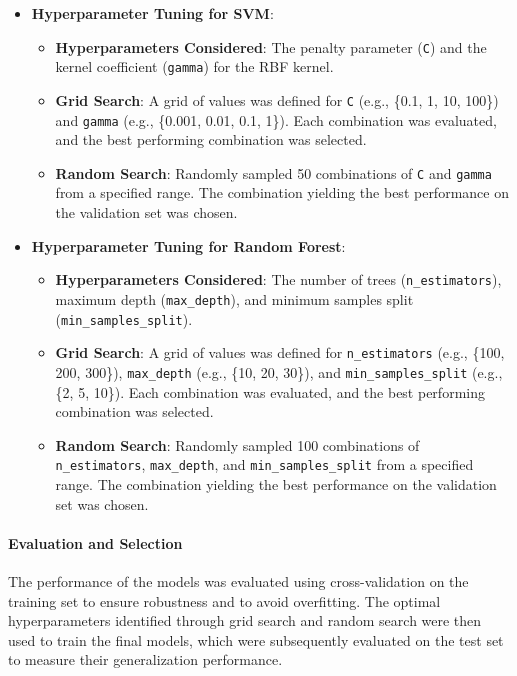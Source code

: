 \begin{itemize}
    \item \textbf{Hyperparameter Tuning for SVM}:
    \begin{itemize}
        \item \textbf{Hyperparameters Considered}: The penalty parameter (\texttt{C}) and the kernel coefficient (\texttt{gamma}) for the RBF kernel.
        \item \textbf{Grid Search}: A grid of values was defined for \texttt{C} (e.g., \{0.1, 1, 10, 100\}) and \texttt{gamma} (e.g., \{0.001, 0.01, 0.1, 1\}). Each combination was evaluated, and the best performing combination was selected.
        \item \textbf{Random Search}: Randomly sampled 50 combinations of \texttt{C} and \texttt{gamma} from a specified range. The combination yielding the best performance on the validation set was chosen.
    \end{itemize}
    \item \textbf{Hyperparameter Tuning for Random Forest}:
    \begin{itemize}
        \item \textbf{Hyperparameters Considered}: The number of trees (\texttt{n\_estimators}), maximum depth (\texttt{max\_depth}), and minimum samples split (\texttt{min\_samples\_split}).
        \item \textbf{Grid Search}: A grid of values was defined for \texttt{n\_estimators} (e.g., \{100, 200, 300\}), \texttt{max\_depth} (e.g., \{10, 20, 30\}), and \texttt{min\_samples\_split} (e.g., \{2, 5, 10\}). Each combination was evaluated, and the best performing combination was selected.
        \item \textbf{Random Search}: Randomly sampled 100 combinations of \texttt{n\_estimators}, \texttt{max\_depth}, and \texttt{min\_samples\_split} from a specified range. The combination yielding the best performance on the validation set was chosen.
    \end{itemize}
\end{itemize}

\paragraph{Evaluation and Selection}

The performance of the models was evaluated using cross-validation on the training set to ensure robustness and to avoid overfitting. The optimal hyperparameters identified through grid search and random search were then used to train the final models, which were subsequently evaluated on the test set to measure their generalization performance.


